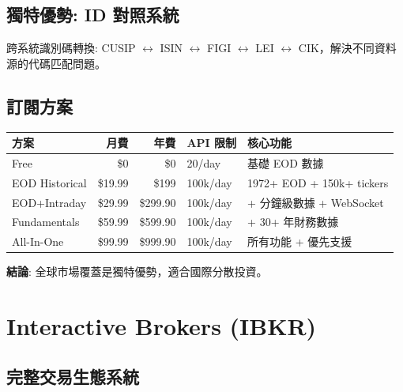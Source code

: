 \documentclass[11pt,a4paper]{article}
\begin{document}
\subsection{獨特優勢: ID 對照系統}

跨系統識別碼轉換: CUSIP $\leftrightarrow$ ISIN $\leftrightarrow$ FIGI $\leftrightarrow$ LEI $\leftrightarrow$ CIK，解決不同資料源的代碼匹配問題。

\subsection{訂閱方案}

\begin{table}[H]
\centering
\begin{tabular}{@{}lrrll@{}}
\toprule
\textbf{方案} & \textbf{月費} & \textbf{年費} & \textbf{API 限制} & \textbf{核心功能} \\
\midrule
Free & \$0 & \$0 & 20/day & 基礎 EOD 數據 \\
EOD Historical & \$19.99 & \$199 & 100k/day & 1972+ EOD + 150k+ tickers \\
EOD+Intraday & \$29.99 & \$299.90 & 100k/day & + 分鐘級數據 + WebSocket \\
Fundamentals & \$59.99 & \$599.90 & 100k/day & + 30+ 年財務數據 \\
All-In-One & \$99.99 & \$999.90 & 100k/day & 所有功能 + 優先支援 \\
\bottomrule
\end{tabular}
\end{table}

\textbf{結論}: 全球市場覆蓋是獨特優勢，適合國際分散投資。

\newpage
\section{Interactive Brokers (IBKR)}

\subsection{完整交易生態系統}
\end{document}
